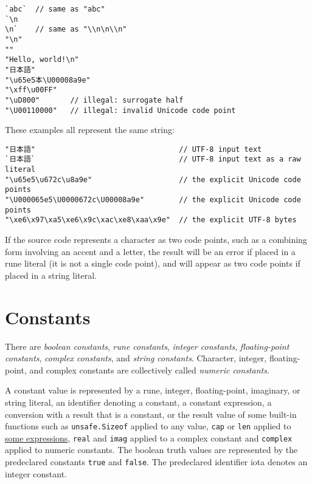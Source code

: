 \begin{Verbatim}[frame=single]
`abc`  // same as "abc"
`\n
\n`    // same as "\\n\n\\n"
"\n"
""
"Hello, world!\n"
"日本語"
"\u65e5本\U00008a9e"
"\xff\u00FF"
"\uD800"       // illegal: surrogate half
"\U00110000"   // illegal: invalid Unicode code point
\end{Verbatim}

These examples all represent the same string:

\begin{Verbatim}[frame=single]
"日本語"                                 // UTF-8 input text
`日本語`                                 // UTF-8 input text as a raw literal
"\u65e5\u672c\u8a9e"                    // the explicit Unicode code points
"\U000065e5\U0000672c\U00008a9e"        // the explicit Unicode code points
"\xe6\x97\xa5\xe6\x9c\xac\xe8\xaa\x9e"  // the explicit UTF-8 bytes
\end{Verbatim}

If the source code represents a character as two code points, such as a
combining form involving an accent and a letter, the result will be an
error if placed in a rune literal (it is not a single code point), and
will appear as two code points if placed in a string literal.

\section*{Constants}

There are \emph{boolean constants}, \emph{rune constants}, \emph{integer
constants}, \emph{floating-point constants}, \emph{complex constants},
and \emph{string constants}. Character, integer, floating-point, and
complex constants are collectively called \emph{numeric constants}.

A constant value is represented by a rune,
integer,
floating-point,
imaginary, or
string literal, an identifier denoting a
constant, a constant expression, a
conversion with a result that is a constant, or
the result value of some built-in functions such as
\texttt{unsafe.Sizeof} applied to any value, \texttt{cap} or
\texttt{len} applied to \hyperref[Length\_and\_capacity]{some
expressions}, \texttt{real} and \texttt{imag} applied to a complex
constant and \texttt{complex} applied to numeric constants. The boolean
truth values are represented by the predeclared constants \texttt{true}
and \texttt{false}. The predeclared identifier iota
denotes an integer constant.

